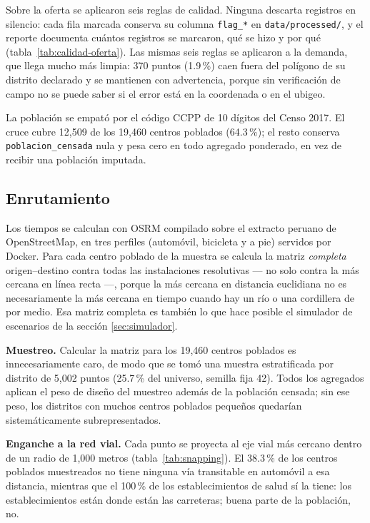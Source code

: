 \documentclass[11pt,a4paper]{article}
\begin{document}
Sobre la oferta se aplicaron seis reglas de calidad. Ninguna descarta
registros en silencio: cada fila marcada conserva su columna \texttt{flag\_*}
en \texttt{data/processed/}, y el reporte documenta cuántos registros se
marcaron, qué se hizo y por qué (tabla~\ref{tab:calidad-oferta}). Las mismas
seis reglas se aplicaron a la demanda, que llega mucho más limpia: 370 puntos
(1.9\,\%) caen fuera del polígono de su distrito declarado y se mantienen con
advertencia, porque sin verificación de campo no se puede saber si el error
está en la coordenada o en el ubigeo.

\begin{table}[H]
\centering
\caption{Reglas de calidad aplicadas a la oferta (RENIPRESS).}
\label{tab:calidad-oferta}
\footnotesize

\end{table}

La población se empató por el código CCPP de 10 dígitos del Censo 2017. El
cruce cubre 12{,}509 de los 19{,}460 centros poblados (64.3\,\%); el resto
conserva \texttt{poblacion\_censada} nula y pesa cero en todo agregado
ponderado, en vez de recibir una población imputada.

\subsection{Enrutamiento}

Los tiempos se calculan con OSRM \cite{osrm} compilado sobre el extracto
peruano de OpenStreetMap, en tres perfiles (automóvil, bicicleta y a pie)
servidos por Docker. Para cada centro poblado de la muestra se calcula la
matriz \emph{completa} origen--destino contra todas las instalaciones
resolutivas --- no solo contra la más cercana en línea recta ---, porque la
más cercana en distancia euclidiana no es necesariamente la más cercana en
tiempo cuando hay un río o una cordillera de por medio. Esa matriz completa es
también lo que hace posible el simulador de escenarios de la sección
\ref{sec:simulador}.

\textbf{Muestreo.} Calcular la matriz para los 19{,}460 centros poblados es
innecesariamente caro, de modo que se tomó una muestra estratificada por
distrito de 5{,}002 puntos (25.7\,\% del universo, semilla fija 42). Todos los
agregados aplican el peso de diseño del muestreo además de la población
censada; sin ese peso, los distritos con muchos centros poblados pequeños
quedarían sistemáticamente subrepresentados.

\textbf{Enganche a la red vial.} Cada punto se proyecta al eje vial más
cercano dentro de un radio de 1{,}000 metros (tabla~\ref{tab:snapping}). El
38.3\,\% de los centros poblados muestreados no tiene ninguna vía transitable
en automóvil a esa distancia, mientras que el 100\,\% de los establecimientos
de salud sí la tiene: los establecimientos están donde están las carreteras;
buena parte de la población, no.
\end{document}
